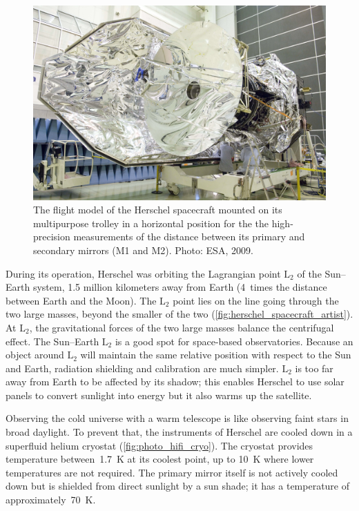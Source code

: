 \begin{figure}
    \centering
    \includegraphics[width=.8\textwidth]{herschel_spacecraft}
    \caption{The flight model of the Herschel spacecraft mounted on its multipurpose trolley in a horizontal position for the the high-precision measurements of the distance between its primary and secondary mirrors (M1 and M2).  Photo: ESA, 2009.}
    \label{fig:photo_herschel}
\end{figure}


During its operation, Herschel was orbiting the Lagrangian point $\text{L}_2$ of the Sun--Earth system, 1.5 million kilometers away from Earth (4~times the distance between Earth and the Moon).
The $\text{L}_2$ point lies on the line going through the two large masses, beyond the smaller of the two (\cref{fig:herschel_spacecraft_artist}).
At $\text{L}_2$, the gravitational forces of the two large masses balance the centrifugal effect.
The Sun--Earth $\text{L}_2$ is a good spot for space-based observatories.
Because an object around $\text{L}_2$ will maintain the same relative position with respect to the Sun and Earth, radiation shielding and calibration are much simpler.
$\text{L}_2$ is too far away from Earth to be affected by its shadow;
this enables Herschel to use solar panels to convert sunlight into energy
but it also warms up the satellite.

Observing the cold universe with a warm telescope is like observing faint stars in broad daylight.
To prevent that, the instruments of Herschel are cooled down in a superfluid helium cryostat (\cref{fig:photo_hifi_cryo}).
The cryostat provides temperature between~\SI{1.7}{\kelvin} at its coolest point, up to \SI{10}{\kelvin} where lower temperatures are not required.
The primary mirror itself is not actively cooled down but is shielded from direct sunlight by a sun shade; it has a temperature of approximately~\SI{70}{\kelvin}.

